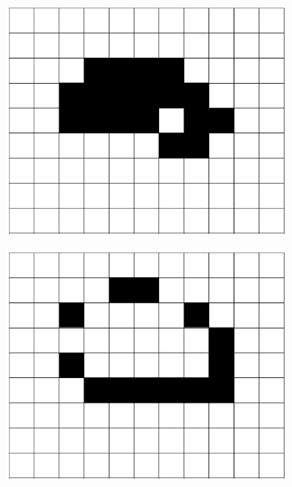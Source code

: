 \documentclass[12pt]{article}
\numberwithin{figure}{section} %
\begin{document}
\begin{figure}[H]
\begin{subfigure}{0.18\textwidth}
     		\subcaption{}
   	\end{subfigure}
     	\begin{subfigure}{0.18\textwidth}
    		\centering
     		\includegraphics[width=\linewidth]{Section1/7.1}
     		\subcaption{}
   	\end{subfigure}
     	\begin{subfigure}{0.18\textwidth}
     		\centering
     		\includegraphics[width=\linewidth]{Section1/7.2}
     		\subcaption{}
   	\end{subfigure}
    	\begin{subfigure}{0.18\textwidth}

\end{subfigure}
\end{figure}
\end{document}
